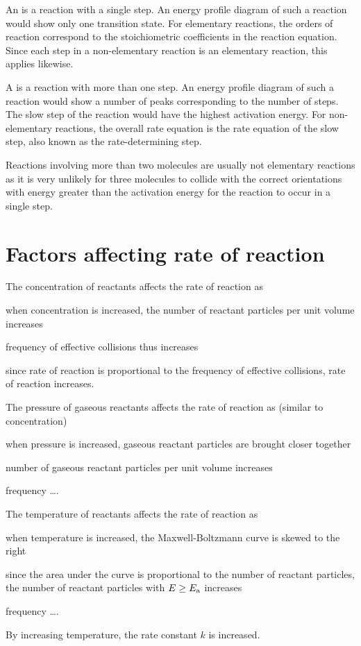 \documentclass[Chemistry.tex]{subfiles}
\begin{document}
An  is a reaction with a single step. An energy profile diagram of such a reaction would show only one transition state. For elementary reactions, the orders of reaction correspond to the stoichiometric coefficients in the reaction equation. Since each step in a non-elementary reaction is an elementary reaction, this applies likewise.

A  is a reaction with more than one step. An energy profile diagram of such a reaction would show a number of peaks corresponding to the number of steps. The slow step of the reaction would have the highest activation energy. For non-elementary reactions, the overall rate equation is the rate equation of the slow step, also known as the rate-determining step.

Reactions involving more than two molecules are usually not elementary reactions as it is very unlikely for three molecules to collide with the correct orientations with energy greater than the activation energy for the reaction to occur in a single step.
\section{Factors affecting rate of reaction}
The concentration of reactants affects the rate of reaction as \begin{slinenum}
\item when concentration is increased, the number of reactant particles per unit volume increases
\item frequency of effective collisions thus increases
\item since rate of reaction is proportional to the frequency of effective collisions, rate of reaction increases.
\end{slinenum}

The pressure of gaseous reactants affects the rate of reaction as (similar to concentration) \begin{slinenum}
\item when pressure is increased, gaseous reactant particles are brought closer together
\item number of gaseous reactant particles per unit volume increases
\item frequency \ldots{}.
\end{slinenum}

The temperature of reactants affects the rate of reaction as \begin{slinenum}
\item when temperature is increased, the Maxwell-Boltzmann curve is skewed to the right
\item since the area under the curve is proportional to the number of reactant particles, the number of reactant particles with \(E \ge \slEa\) increases
\item frequency \ldots{}.
\end{slinenum} By increasing temperature, the rate constant \(k\) is increased.
\end{document}
